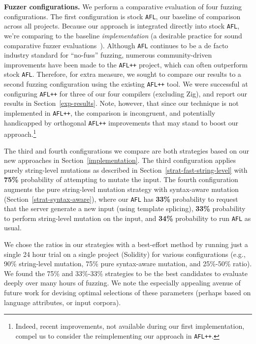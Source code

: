 \noindent \textbf{Fuzzer configurations.} We perform a comparative evaluation
of four fuzzing configurations.  The first configuration is stock \texttt{AFL},
our baseline of comparison across all projects. Because our approach is
integrated directly into stock \texttt{AFL}, we're comparing to the baseline
\emph{implementation} (a desirable practice for sound comparative fuzzer
evaluations~\cite{BoehmeCR21}).
Although \texttt{AFL} continues to be a de facto industry standard for
``no-fuss'' fuzzing, numerous community-driven improvements have been made to
the \texttt{AFL++} project, which can often outperform stock \texttt{AFL}.
Therefore, for extra measure, we sought to compare our results to a second
fuzzing configuration using the existing \texttt{AFL++} tool. We were
successful at configuring \texttt{AFL++} for three of our four compilers
(excluding Zig), and report our results in Section~\ref{exp-results}.
Note, however, that since our technique is not implemented in \texttt{AFL++}, the
comparison is incongruent, and potentially handicapped by orthogonal
\texttt{AFL++} improvements that may stand to boost our
approach.\footnote{Indeed, recent improvements, not available
during our first implementation, compel us to consider the
reimplementing our approach in \texttt{AFL++}.}

The third and fourth configurations we compare are both strategies based on our
new approaches in Section~\ref{implementation}. The third configuration applies
purely string-level mutations as described in
Section~\ref{strat-fast-string-level} with \textbf{75\%} probability of
attempting to mutate the input. The fourth configuration augments the pure
string-level mutation strategy with syntax-aware mutation
(Section~\ref{strat-syntax-aware}), where our \texttt{AFL} has \textbf{33\%}
probability to request that the server generate a new input (using template
splicing), \textbf{33\%} probability to perform string-level mutation on the
input, and \textbf{34\%} probability to run \texttt{AFL} as usual.

We chose the ratios in our strategies with a best-effort method by running just
a single 24 hour trial on a single project (Solidity) for various
configurations (e.g., 90\% string-level mutation, 75\% pure syntax-aware
mutation, and 25\%-50\% ratio). We found the 75\% and 33\%-33\% strategies
to be the best candidates to evaluate deeply over many hours of fuzzing. We
note the especially appealing avenue of future work for devising optimal
selections of these parameters (perhaps based on language attributes, or input
corpora).

